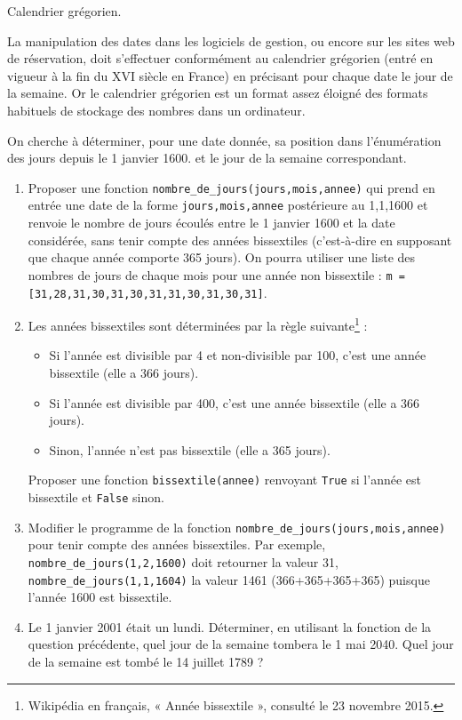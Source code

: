 \begin{exercice}Calendrier grégorien.

La manipulation des dates dans les logiciels de gestion, ou encore sur les sites web de réservation, doit s'effectuer conformément au calendrier grégorien (entré en vigueur à la fin du XVI siècle en France) en précisant pour chaque date le jour de la semaine. Or le calendrier grégorien est un format assez éloigné des formats habituels de stockage des nombres dans un ordinateur. 

On cherche à déterminer, pour une date donnée, sa position dans l'énumération des jours depuis le 1 janvier 1600. et le jour de la semaine correspondant.

\begin{enumerate}
 \item Proposer une fonction \texttt{nombre\_de\_jours(jours,mois,annee)} qui prend en entrée une date de la forme \texttt{jours,mois,annee} postérieure au 1,1,1600 et renvoie le nombre de jours écoulés entre le 1 janvier 1600 et la date considérée, sans tenir compte des années bissextiles (c'est-à-dire en supposant que chaque année comporte 365 jours). On pourra utiliser une liste des nombres de jours de chaque mois pour une année non bissextile : \texttt{m = [31,28,31,30,31,30,31,31,30,31,30,31]}.

\item Les années bissextiles sont déterminées par la règle suivante\footnote{Wikipédia en français, « Année bissextile », consulté le 23 novembre 2015.} : 
\begin{itemize}
\item Si l'année est divisible par 4 et non-divisible par 100, c'est une année bissextile (elle a 366 jours).
\item Si l'année est divisible par 400, c'est une année bissextile (elle a 366 jours).
\item Sinon, l'année n'est pas bissextile (elle a 365 jours).
\end{itemize} 

Proposer une fonction \texttt{bissextile(annee)} renvoyant \texttt{True} si l'année est bissextile et \texttt{False} sinon.

 \item Modifier le programme de la fonction \texttt{nombre\_de\_jours(jours,mois,annee)} pour tenir compte des années bissextiles. Par exemple, \texttt{nombre\_de\_jours(1,2,1600)} doit retourner la valeur 31, \texttt{nombre\_de\_jours(1,1,1604)} la valeur 1461 (366+365+365+365) puisque l'année 1600 est bissextile.
 
 \item Le 1 janvier 2001 était un lundi. Déterminer, en utilisant la fonction de la question précédente, quel jour de la semaine tombera le 1 mai 2040. Quel jour de la semaine est tombé le 14 juillet 1789 ?
\end{enumerate}
\end{exercice}



